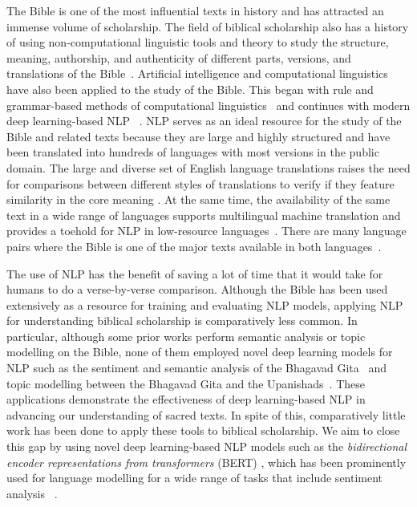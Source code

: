 \documentclass[5p,times]{elsarticle}
\begin{document}
The Bible is one of the most influential texts in history and has attracted an immense volume of scholarship. \cite{levenson1993hebrew,moorey1991century,young1999biblical} The field of biblical scholarship also has a  history of using non-computational linguistic tools and theory to study the structure, meaning, authorship, and authenticity of different parts, versions, and translations of the Bible~\cite{hamilton1903historical, haupt1925philologic,brown1927english,nida1972implications}. Artificial intelligence and computational linguistics have also been applied to the study of the Bible. This began with rule and grammar-based methods of computational linguistics~\cite{jappinen1986associative} and continues with modern deep learning-based  NLP  ~\cite{jones2022machine}. NLP serves as an ideal resource for the study of  the Bible and related texts  because they are large and highly structured and have been translated into hundreds  of languages  with most versions in the public domain.  The large and diverse set of English language translations raises the need for comparisons between different styles of translations to verify if they feature similarity in the core meaning \cite{carlson2018evaluating}. At the same time, the availability of the same text in a wide range of languages supports multilingual machine translation and provides a toehold for NLP in low-resource languages~\cite{kim2015part}. There are many language pairs where the Bible is one of the major texts available in both languages~\cite{agic2015if}. 

 The use of NLP has the benefit of saving a lot of time that it would take for humans to do a verse-by-verse comparison. Although the Bible has been used extensively as a resource for training and evaluating NLP models, applying NLP for understanding biblical scholarship is comparatively less common. In particular, although some prior works perform semantic analysis or topic modelling on the Bible, none of them employed novel deep learning models for NLP such as the sentiment and semantic analysis of the Bhagavad Gita~\cite{chandra2022semantic} and topic modelling between the Bhagavad Gita and the Upanishads~\cite{chandra2022artificial}.  These applications demonstrate the effectiveness of deep learning-based  NLP  in advancing our understanding of sacred texts. In spite of this, comparatively little work has been done to apply these tools to biblical scholarship. We aim to close this gap by using novel deep learning-based NLP models such as the \textit{bidirectional encoder representations from transformers} (BERT) \cite{devlin2018bert,rogers2020primer}, which has been prominently used for language modelling for a wide range of tasks that include sentiment analysis ~\cite{chandra2022semantic}.
\end{document}
